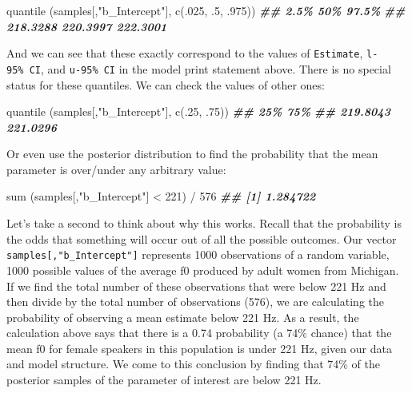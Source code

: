 \documentclass[
]{book}
\newenvironment{Shaded}{\begin{snugshade}}{\end{snugshade}}
\newcommand{\DecValTok}[1]{\textcolor[rgb]{0.00,0.00,0.81}{#1}}
\newcommand{\DocumentationTok}[1]{\textcolor[rgb]{0.56,0.35,0.01}{\textbf{\textit{#1}}}}
\newcommand{\FunctionTok}[1]{\textcolor[rgb]{0.00,0.00,0.00}{#1}}
\newcommand{\NormalTok}[1]{#1}
\newcommand{\SpecialCharTok}[1]{\textcolor[rgb]{0.00,0.00,0.00}{#1}}
\newcommand{\StringTok}[1]{\textcolor[rgb]{0.31,0.60,0.02}{#1}}
\begin{document}
\begin{Shaded}
\begin{Highlighting}[]
\FunctionTok{quantile}\NormalTok{ (samples[,}\StringTok{"b\_Intercept"}\NormalTok{], }\FunctionTok{c}\NormalTok{(.}\DecValTok{025}\NormalTok{, .}\DecValTok{5}\NormalTok{, .}\DecValTok{975}\NormalTok{))}
\DocumentationTok{\#\#     2.5\%      50\%    97.5\% }
\DocumentationTok{\#\# 218.3288 220.3997 222.3001}
\end{Highlighting}
\end{Shaded}

And we can see that these exactly correspond to the values of \texttt{Estimate}, \texttt{l-95\%\ CI}, and \texttt{u-95\%\ CI} in the model print statement above. There is no special status for these quantiles. We can check the values of other ones:

\begin{Shaded}
\begin{Highlighting}[]
\FunctionTok{quantile}\NormalTok{ (samples[,}\StringTok{"b\_Intercept"}\NormalTok{], }\FunctionTok{c}\NormalTok{(.}\DecValTok{25}\NormalTok{, .}\DecValTok{75}\NormalTok{))}
\DocumentationTok{\#\#      25\%      75\% }
\DocumentationTok{\#\# 219.8043 221.0296}
\end{Highlighting}
\end{Shaded}

Or even use the posterior distribution to find the probability that the mean parameter is over/under any arbitrary value:

\begin{Shaded}
\begin{Highlighting}[]
\FunctionTok{sum}\NormalTok{ (samples[,}\StringTok{"b\_Intercept"}\NormalTok{] }\SpecialCharTok{\textless{}} \DecValTok{221}\NormalTok{) }\SpecialCharTok{/} \DecValTok{576}
\DocumentationTok{\#\# [1] 1.284722}
\end{Highlighting}
\end{Shaded}

Let's take a second to think about why this works. Recall that the probability is the odds that something will occur out of all the possible outcomes. Our vector \texttt{samples{[},"b\_Intercept"{]}} represents 1000 observations of a random variable, 1000 possible values of the average f0 produced by adult women from Michigan. If we find the total number of these observations that were below 221 Hz and then divide by the total number of observations (576), we are calculating the probability of observing a mean estimate below 221 Hz. As a result, the calculation above says that there is a 0.74 probability (a 74\% chance) that the mean f0 for female speakers in this population is under 221 Hz, given our data and model structure. We come to this conclusion by finding that 74\% of the posterior samples of the parameter of interest are below 221 Hz.
\end{document}
